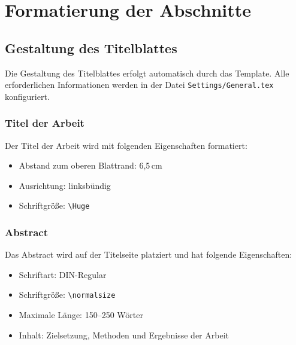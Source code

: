 
\chapter{Formatierung der Abschnitte}
\label{chap:formatierung_abschnitte}

\section{Gestaltung des Titelblattes}
\label{sec:titelblatt}

Die Gestaltung des Titelblattes erfolgt automatisch durch das Template. Alle erforderlichen Informationen werden in der Datei \texttt{Settings/General.tex} konfiguriert.

\subsection*{Titel der Arbeit}
\label{subsec:titel_arbeit}

Der Titel der Arbeit wird mit folgenden Eigenschaften formatiert:
\begin{itemize}
	\item Abstand zum oberen Blattrand: 6,5\,cm
	\item Ausrichtung: linksbündig
	\item Schriftgröße: \texttt{\textbackslash Huge}
\end{itemize}

\subsection*{Abstract}
\label{subsec:abstract}

Das Abstract wird auf der Titelseite platziert und hat folgende Eigenschaften:
\begin{itemize}
	\item Schriftart: DIN-Regular
	\item Schriftgröße: \texttt{\textbackslash normalsize}
	\item Maximale Länge: 150–250 Wörter
	\item Inhalt: Zielsetzung, Methoden und Ergebnisse der Arbeit
\end{itemize}

